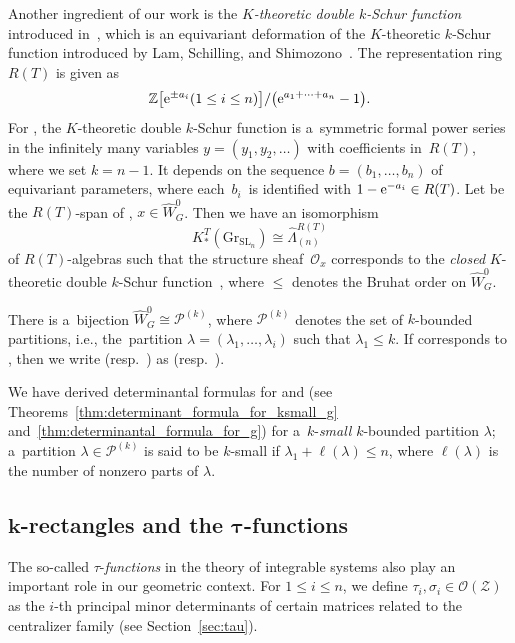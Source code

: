 \documentclass[10pt,a4paper]{amsart}
\numberwithin{equation}{section}
\newcommand{\Gr}{\mathrm{Gr}}
\newcommand{\la}{\lambda}
\newcommand{\Rep}{{R(T)}}
\newcommand{\SL}{\mathrm{SL}}
\newcommand{\Z}{\mathbb{Z}}
\theoremstyle{definition}
\begin{document}
Another ingredient of
our work is the \emph{$K$-theoretic double $k$-Schur function} introduced in~\cite{ISY}, which is an equivariant deformation of the $K$-theoretic $k$-Schur function introduced by Lam, Schilling, and Shimozono~\cite{LSS:K}.
The representation ring $\Rep$ is given as
\[
\Z\big[{\rm e}^{\pm a_i} (1\le i\le n)\big]/\bigl({\rm e}^{a_1+\cdots+a_n}-1\bigr).
\]
For , the $K$-theoretic double $k$-Schur function  is a~symmetric formal power series in the infinitely many variables $y=(y_1,y_2,\dots)$ with coefficients in~$\Rep$, where we set $k=n-1$.
It depends on the sequence $b=(b_1,\dots,b_n)$ of equivariant parameters, where each~$b_i$~is identified
with $1-{\rm e}^{-a_i}\in \Rep$.
 Let \smash{$\hat{\Lambda}^{\Rep}_{(n)}$} be the $\Rep$-span of , $
 x\in \hat{W}_G^0$. Then we have an isomorphism
\[
 K_*^T(\Gr_{\SL_n})\cong \hat{\Lambda}^{\Rep}_{(n)}
\]
 of $\Rep$-algebras such that the structure sheaf~$\mathscr{O}_x$ corresponds to the \emph{closed} $K$-theoretic double $k$-Schur function~, where $\le $ denotes
 the Bruhat order on $\hat{W}_G^0$.

There is a~bijection $\hat{W}_G^0\cong \mathscr{P}^{(k)}$, where
$\mathscr{P}^{(k)}$ denotes the set of $k$-bounded partitions, i.e., the~partition $\la=(\la_1,\dots,\la_i)$ such that
$\la_1\le k$.
If  corresponds to
\smash{$\la\in \mathscr{P}^{(k)}$},
then we write  \big(resp.\ \big)
as \smash{$g_\la^{(k)}(y|b)$} \big(resp.\ \smash{$\tilde{g}_\la^{(k)}(y|b)$}\big).

We have derived determinantal formulas for
\smash{$g^{(k)}_\la(y|b)$} and \smash{$\tilde{g}_\la^{(k)}(y|b)$} (see Theorems~\ref{thm:determinant_formula_for_ksmall_g} and~\ref{thm:determinantal_formula_for_g})
for a~$k$-\emph{small} $k$-bounded partition $\la$; a~partition $\la\in \mathscr{P}^{(k)}$ is said to be $k$-small if $\la_1+\ell(\la)\le n$, where
$\ell(\la)$ is the number of nonzero parts of $\la$.

\subsection[k-rectangles and the tau-functions]{$\boldsymbol{k}$-rectangles and the $\boldsymbol{\tau}$-functions}
The so-called $\tau$-\emph{functions} in the theory of integrable systems also play an important role in our geometric context. For $1\le i\le n$, we define
$\tau_i,\sigma_i\in \mathscr{O}(\mathscr{Z})$ as the $i$-th principal minor determinants of certain matrices
related to the centralizer family (see Section~\ref{sec:tau}).
\end{document}
